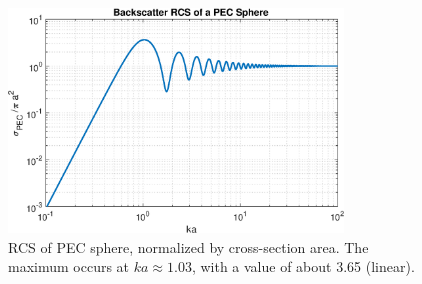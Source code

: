 %
%
%
%
%
%
%
%
%
%
%
%
%
%


%
%
%
%


\begin{figure}[H] 
   \centering
   \includegraphics[width=3.5in]{Tmatrix/Figures/brcspecsphere} 
   \caption{RCS of PEC sphere, normalized by cross-section area.  The maximum occurs at $ka \approx 1.03$, with a value of about 3.65 (linear).}
\end{figure}


